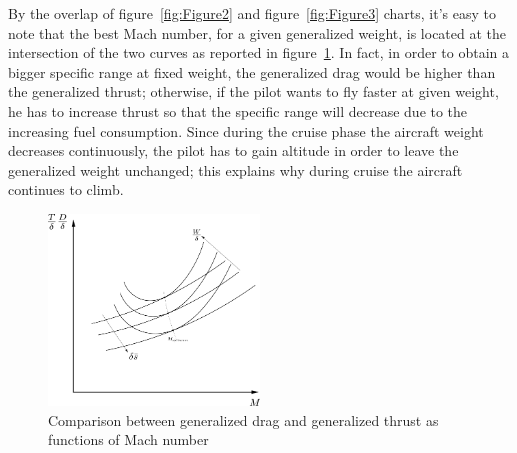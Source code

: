 \bigskip
\noindent
By the overlap of figure~\ref{fig:Figure2} and figure~\ref{fig:Figure3} charts, it's easy to note that the best Mach number, for a given generalized weight, is located at the intersection of the two curves as reported in figure~\ref{fig:Figure4}. In fact, in order to obtain a bigger specific range at fixed weight, the generalized drag would be higher than the generalized thrust; otherwise, if the pilot wants to fly faster at given weight, he has to increase thrust so that the specific range will decrease due to the increasing fuel consumption.
%
Since during the cruise phase the aircraft weight decreases continuously, the pilot has to gain altitude in order to leave the generalized weight unchanged; this explains why during cruise the aircraft continues to climb. 
%
\begin{figure}[t]
\centering
\includegraphics[keepaspectratio, width=0.50\textwidth]{TDeltaDragDelta}
\caption{Comparison between generalized drag and generalized thrust as functions of Mach number}
\label{fig:Figure4}
\end{figure}

